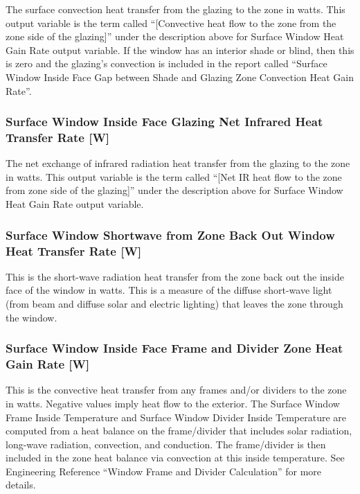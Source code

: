 The surface convection heat transfer from the glazing to the zone in watts. This output variable is the term called ``{[}Convective heat flow to the zone from the zone side of the glazing{]}'' under the description above for Surface Window Heat Gain Rate output variable. If the window has an interior shade or blind, then this is zero and the glazing's convection is included in the report called ``Surface Window Inside Face Gap between Shade and Glazing Zone Convection Heat Gain Rate''.

\subsubsection{Surface Window Inside Face Glazing Net Infrared Heat Transfer Rate {[}W{]}}\label{surface-window-inside-face-glazing-net-infrared-heat-transfer-rate-w}

The net exchange of infrared radiation heat transfer from the glazing to the zone in watts. This output variable is the term called ``{[}Net IR heat flow to the zone from zone side of the glazing{]}'' under the description above for Surface Window Heat Gain Rate output variable.

\subsubsection{Surface Window Shortwave from Zone Back Out Window Heat Transfer Rate {[}W{]}}\label{surface-window-shortwave-from-zone-back-out-window-heat-transfer-rate-w}

This is the short-wave radiation heat transfer from the zone back out the inside face of the window in watts. This is a measure of the diffuse short-wave light (from beam and diffuse solar and electric lighting) that leaves the zone through the window.

\subsubsection{Surface Window Inside Face Frame and Divider Zone Heat Gain Rate {[}W{]}}\label{surface-window-inside-face-frame-and-divider-zone-heat-gain-rate-w}

This is the convective heat transfer from any frames and/or dividers to the zone in watts. Negative values imply heat flow to the exterior. The Surface Window Frame Inside Temperature and Surface Window Divider Inside Temperature are computed from a heat balance on the frame/divider that includes solar radiation, long-wave radiation, convection, and conduction. The frame/divider is then included in the zone heat balance via convection at this inside temperature. See Engineering Reference ``Window Frame and Divider Calculation'' for more details.

